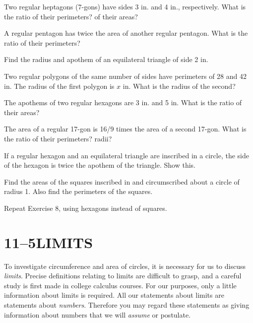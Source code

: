 \documentclass[11pt]{book}
\theoremstyle{bkplain}
\theoremstyle{XIplainnote}
\theoremstyle{bkplain}
\theoremstyle{bkplain}
\begin{document}
\begin{exercisecols}
\begin{exlist}
\item Two regular heptagons (7-gons) have sides 3 in. and 4 in., respectively.
      What is the ratio of their perimeters? of their areas?
\item A regular pentagon has twice the area of another regular pentagon. What
      is the ratio of their perimeters?
\item Find the radius and apothem of an equilateral triangle of side 2 in.
\item Two regular polygons of the same number of sides have perimeters of 28
      and 42 in. The radius of the first polygon is $x$ in. What is the radius
      of the second?
\item The apothems of two regular hexagons are 3 in. and 5 in. What is the
      ratio of their areas?
\item The area of a regular 17-gon is 16/9 times the area of a second 17-gon.
      What is the ratio of their perimeters? radii?
\item If a regular hexagon and an equilateral triangle are inscribed in a
      circle, the side of the hexagon is twice the apothem of the triangle.
      Show this.
\item Find the areas of the squares inscribed in and circumscribed about a
      circle of radius 1. Also find the perimeters of the squares.
\item Repeat Exercise 8, using hexagons instead of squares.
\end{exlist}
\end{exercisecols}

\section*{11--5\quad LIMITS}

To investigate circumference and area of circles, it is necessary for us to
discuss \emph{limits}. Precise definitions relating to limits are difficult to
grasp, and a careful study is first made in college calculus courses. For our
purposes, only a little information about limits is required. All our
statements about limits are statements about \emph{numbers}. Therefore you may
regard these statements as giving information about numbers that we will
\emph{assume} or postulate.
\end{document}
